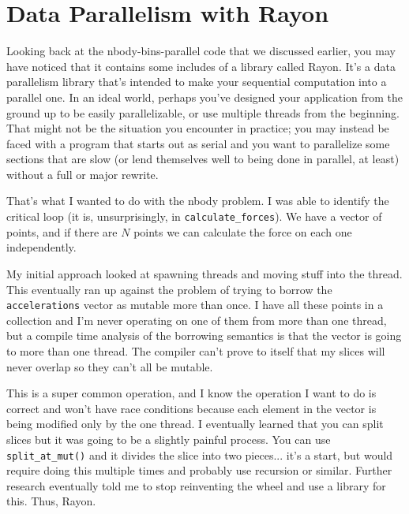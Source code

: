 




\section*{Data Parallelism with Rayon}

Looking back at the nbody-bins-parallel code that we discussed earlier, you may have noticed that it contains some includes of a library called Rayon. It's a data parallelism library that's intended to make your sequential computation into a parallel one. In an ideal world, perhaps you've designed your application from the ground up to be easily parallelizable, or use multiple threads from the beginning. That might not be the situation you encounter in practice; you may instead be faced with a program that starts out as serial and you want to parallelize some sections that are slow (or lend themselves well to being done in parallel, at least) without a full or major rewrite.

That's what I wanted to do with the nbody problem. I was able to identify the critical loop (it is, unsurprisingly, in \texttt{calculate\_forces}). We have a vector of points, and if there are $N$ points we can calculate the force on each one independently. 

My initial approach looked at spawning threads and moving stuff into the thread. This eventually ran up against the problem of trying to borrow the \texttt{accelerations} vector as mutable more than once. I have all these points in a collection and I'm never operating on one of them from more than one thread, but a compile time analysis of the borrowing semantics is that the vector is going to more than one thread. The compiler can't prove to itself that my slices will never overlap so they can't all be mutable.

 This is a super common operation, and I know the operation I want to do is correct and won't have race conditions because each element in the vector is being modified only by the one thread. I eventually learned that you can split slices but it was going to be a slightly painful process. You can use \texttt{split\_at\_mut()} and it divides the slice into two pieces... it's a start, but would require doing this multiple times and probably use recursion or similar. Further research eventually told me to stop reinventing the wheel and use a library for this. Thus, Rayon.

